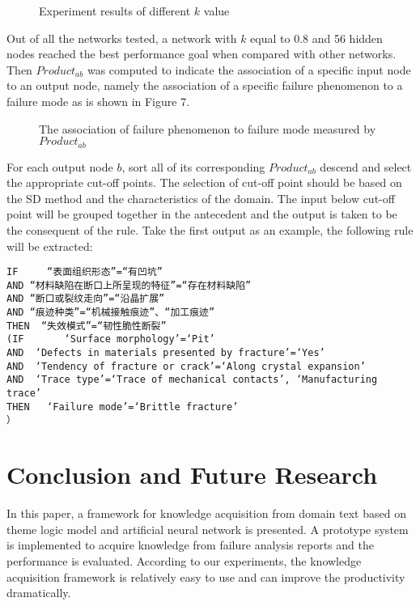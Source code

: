 \documentclass{elsarticle}
\begin{document}
 \begin{figure}[htb]
  \centering
  \caption{Experiment results of different $k$ value}
\label{fig:6}
\end{figure}
 
Out of all the networks tested, a network with $k$ equal to 0.8 and 56
hidden nodes reached the best performance goal when compared with
other networks. Then $Product_{ab}$  was computed to indicate the
association of a specific input node to an output node, namely the
association of a specific failure phenomenon to a failure mode as is
shown in Figure 7. 

 \begin{figure}[htb]
  \centering
  \caption{The association of failure phenomenon to failure mode measured by $Product_{ab}$
}
\label{fig:7}
\end{figure}

For each output node $b$, sort all of its corresponding $Product_{ab}$
descend and select the appropriate cut-off points. The selection of
cut-off point should be based on the SD method and the characteristics
of the domain. The input below cut-off point will be grouped together
in the antecedent and the output is taken to be the consequent of the
rule. Take the first output as an example, the following rule will be
extracted:
\begin{verbatim}
IF     “表面组织形态”=“有凹坑” 
AND “材料缺陷在断口上所呈现的特征”=“存在材料缺陷”
AND “断口或裂纹走向”=“沿晶扩展”
AND “痕迹种类”=“机械接触痕迹”、“加工痕迹”
THEN  “失效模式”=“韧性脆性断裂”
(IF       ‘Surface morphology’=‘Pit’ 
AND  ‘Defects in materials presented by fracture’=‘Yes’
AND  ‘Tendency of fracture or crack’=‘Along crystal expansion’
AND  ‘Trace type’=‘Trace of mechanical contacts’, ‘Manufacturing trace’
THEN   ‘Failure mode’=‘Brittle fracture’
）

\end{verbatim}

\section{Conclusion and Future Research 
}
\label{sec:concl-future-rese}

In this paper, a framework for knowledge acquisition from domain text
based on theme logic model and artificial neural network is
presented. A prototype system is implemented to acquire knowledge from
failure analysis reports and the performance is evaluated. According
to our experiments, the knowledge acquisition framework is relatively
easy to use and can improve the productivity dramatically. 
\end{document}
